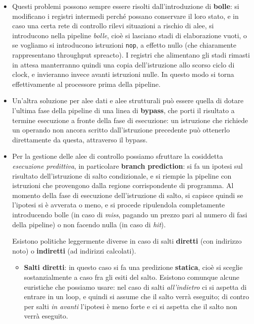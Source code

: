 \documentclass[a4paper,11pt]{article}
\begin{document}
\begin{itemize}
	\item 
		Questi problemi possono sempre essere risolti dall'introduzione di \textbf{bolle}: si modificano i registri intermedi perché possano conservare il loro stato, e in caso una certa rete di controllo rilevi situazioni a rischio di alee, si introducono nella pipeline \textit{bolle}, cioè si lasciano stadi di elaborazione vuoti, o se vogliamo si introducono istruzioni \lstinline|nop|, a effetto nullo (che chiaramente rappresentano throughput spreacto).
		I registri che alimentano gli stadi rimasti in attesa manterranno quindi una copia dell'istruzione allo scorso ciclo di clock, e invieranno invece avanti istruzioni nulle.
		In questo modo si torna effettivamente al processore prima della pipeline.
	\item 
		Un'altra soluzione per alee dati e alee strutturali può essere quella di dotare l'ultima fase della pipeline di una linea di \textbf{bypass}, che porti il risultato a termine esecuzione a fronte della fase di esecuzione: un istruzione che richiede un operando non ancora scritto dall'istruzione precedente può ottenerlo direttamente da questa, attraverso il bypass.

	\item 
		Per la gestione delle alee di controllo possiamo sfruttare la cosiddetta \textit{esecuzione predittiva}, in particolare \textbf{branch prediction}: si fa un ipotesi sul risultato dell'istruzione di salto condizionale, e si riempie la pipeline con istruzioni che provengono dalla regione corrispondente di programma.
		Al momento della fase di esecuzione dell'istruzione di salto, si capisce quindi se l'ipotesi si è avverata o meno, e si procede ripulendola completamente introducendo bolle (in caso di \textit{miss}, pagando un prezzo pari al numero di fasi della pipeline) o non facendo nulla (in caso di \textit{hit}).

		Esistono politiche leggermente diverse in caso di salti \textbf{diretti} (con indirizzo noto) o \textbf{indiretti} (ad indirizzi calcolati).

		\begin{itemize}
			\item 
				\textbf{Salti diretti}: in questo caso si fa una predizione \textbf{statica}, cioè si sceglie sostanzialmente a caso fra gli esiti del salto.
				Esistono comunque alcune euristiche che possiamo usare: nel caso di salti \textit{all'indietro} ci si aspetta di entrare in un loop, e quindi si assume che il salto verrà eseguito; di contro per salti \textit{in avanti} l'ipotesi è meno forte e ci si aspetta che il salto non verrà eseguito. 


\end{itemize}
\end{itemize}
\end{document}
